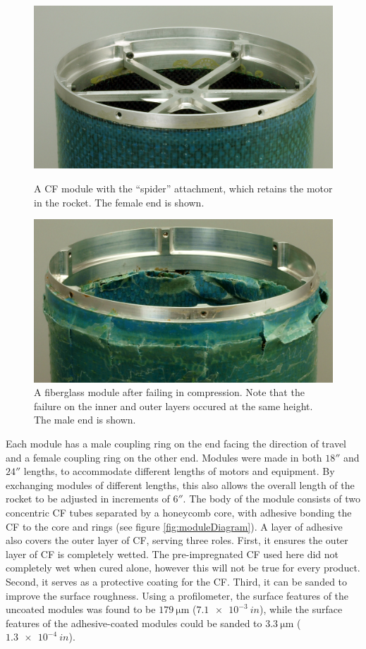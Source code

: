 \documentclass{aiaa-tc}%
\begin{document}
\begin{figure}[t]
	\centering
	\parbox{0.45\linewidth}
	{
		\centering
		\includegraphics[width=\linewidth]{../img/moduleWithSpider.png}
		\caption{A CF module with the ``spider'' attachment, which retains the motor in the rocket. The female end is shown.}
		\label{fig:module}
	}
	\hfill
	\parbox{0.45\linewidth}
	{
		\centering
		\includegraphics[width=\linewidth]{../img/FG_fracture.jpg}
		\caption{A fiberglass module after failing in compression. Note that the failure on the inner and outer layers occured at the same height. The male end is shown.}
		\label{fig:crush}
	}
\end{figure}

Each module has a male coupling ring on the end facing the direction of travel and a female coupling ring on the other end. 
Modules were made in both $18''$ and $24''$ lengths, to accommodate different lengths of motors and equipment. 
By exchanging modules of different lengths, this also allows the overall length of the rocket to be adjusted in increments of $6''$.
The body of the module consists of two concentric CF tubes separated by a honeycomb core, with adhesive bonding the CF to the core and rings (see figure \ref{fig:moduleDiagram}). 
A layer of adhesive also covers the outer layer of CF, serving three roles. First, it ensures the outer layer of CF is completely wetted. 
The pre-impregnated CF used here did not completely wet when cured alone, however this will not be true for every product.
Second, it serves as a protective coating for the CF. 
Third, it can be sanded to improve the surface roughness.
Using a profilometer, the surface features of the uncoated modules was found to be $\SI{179}{\micro\meter}$ ($\SI{7.1e-3}{in}$), while the surface features of the adhesive-coated modules could be sanded to $\SI{3.3}{\micro\meter}$ ($\SI{1.3e-4}{in}$).
\end{document}
